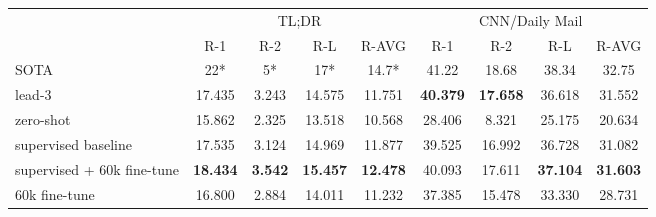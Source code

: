 \begin{table}[t]
\centering
\begin{tabular}{l|cccc|cccc} \toprule
  & \multicolumn{4}{c|}{TL;DR} & \multicolumn{4}{c}{CNN/Daily Mail} \\ 
  & R-1 & R-2 & R-L & R-AVG & R-1 & R-2 & R-L & R-AVG \\ 
  \midrule

SOTA
& 22* & 5* & 17* & 14.7*
& 41.22 & 18.68 & 38.34 & 32.75 \\
\midrule
lead-3 
& 17.435 & 3.243 & 14.575 & 11.751
& \textbf{40.379} & \textbf{17.658} & 36.618 & 31.552
\\

zero-shot 
& 15.862 & 2.325 & 13.518 & 10.568
& 28.406 & 8.321 & 25.175 & 20.634
\\


supervised baseline 
& 17.535 & 3.124 & 14.969 & 11.877 %

& 39.525 & 16.992 & 36.728 & 31.082
\\

supervised + 60k fine-tune
& \textbf{18.434} & \textbf{3.542} & \textbf{15.457} & \textbf{12.478}
& 40.093 & 17.611 & \textbf{37.104} & \textbf{31.603}
\\

60k fine-tune
& 16.800 & 2.884 & 14.011 & 11.232 %
& 37.385 & 15.478 & 33.330 & 28.731
\\


\end{tabular}
\end{table}

